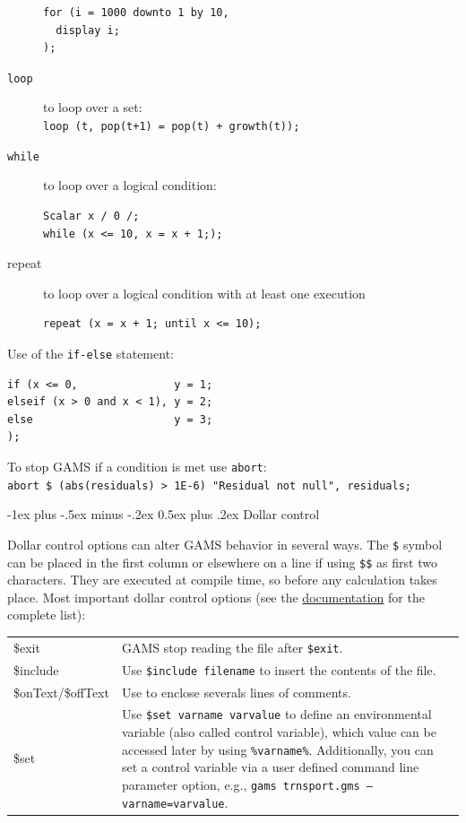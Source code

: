 \documentclass[10pt,landscape,a4paper]{article}
\makeatletter
\renewcommand{\section}{\@startsection{section}{1}{0mm}%
                                {-1ex plus -.5ex minus -.2ex}%
                                {0.5ex plus .2ex}%
                                {\color{blue}\normalfont\large\bfseries}}
\makeatother
\begin{document}
\begin{multicols}{2}
\begin{description}
\begin{multicols}{2}
\begin{verbatim}
for (i = 1000 downto 1 by 10,
  display i;
);
\end{verbatim}
\end{multicols}
\item[\texttt{loop}] to loop over a set:\\
  \verb!loop (t, pop(t+1) = pop(t) + growth(t));!
\item[\texttt{while}] to loop over a logical condition:\\
\begin{verbatim}
Scalar x / 0 /;
while (x <= 10, x = x + 1;);
\end{verbatim}
\item[repeat] to loop over a logical condition with at least one execution
\begin{verbatim}
repeat (x = x + 1; until x <= 10);

\end{verbatim}
\end{description}

Use of the \verb!if-else! statement:\\
\begin{verbatim}
if (x <= 0,               y = 1;
elseif (x > 0 and x < 1), y = 2;
else                      y = 3;
);
\end{verbatim}

To stop GAMS if a condition is met use \verb!abort!:\\
\verb!abort $ (abs(residuals) > 1E-6) "Residual not null", residuals;!

\section{Dollar control}

Dollar control options can alter GAMS behavior in several ways. The \texttt{\$}
symbol can be placed in the first column or elsewhere on a line if using
\texttt{\$\$} as first two characters. They are executed at compile time, so
before any calculation takes place. Most important dollar control options (see
the
\href{https://www.gams.com/latest/docs/UG_DollarControlOptions.html}{documentation}
for the complete list):
\begin{tabularx}{\columnwidth}{@{}>{\ttfamily}lX@{}}
\$exit & GAMS stop reading the file after \texttt{\$exit}.\\
\$include & Use \texttt{\$include filename} to insert the contents of the
file.\\
\$onText\textrm{/}\$offText & Use to enclose severals lines of comments.\\
\$set & Use \texttt{\$set varname varvalue} to define an environmental
variable (also called control variable), which value can be accessed later by using
\texttt{\%varname\%}. Additionally, you can set a control variable via a user defined
command line parameter option, e.g., \texttt{gams~trnsport.gms --varname=varvalue}.
\end{tabularx}


\end{multicols}
\end{document}
